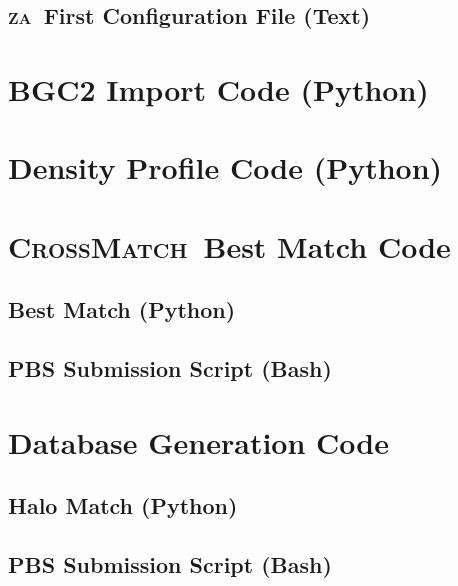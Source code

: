 \documentclass[12pt]{report}
\newcommand{\za}{\textsc{za}}
\newcommand{\crossmatch}{\textsc{CrossMatch}}
\begin{document}
\begin{appendices}
	\section{\za\ First Configuration File (Text)}
	\label{app:crossmatch_za_config}
	

	\chapter{BGC2 Import Code (Python)}
	\label{app:bgc2}
	

	\chapter{Density Profile Code (Python)}
	\label{app:density_profile}
	

	\chapter{\crossmatch\ Best Match Code}
	\label{app:best_match}
	\section{Best Match (Python)}
	\label{app:best_match}
	
	\section{PBS Submission Script (Bash)}
	\label{app:run_best_match}
	

	\chapter{Database Generation Code}
	\label{app:database_generation}
	\section{Halo Match (Python)}
	\label{app:match_halos}
	
	\section{PBS Submission Script (Bash)}
	\label{app:run_match}
	


\end{appendices}
\end{document}
